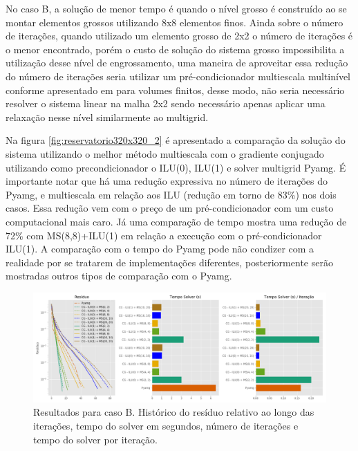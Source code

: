 No caso B, a solução de menor tempo é quando o nível grosso é construído ao se montar elementos grossos utilizando 8x8 elementos finos. Ainda sobre o número de iterações, quando utilizado um elemento grosso de 2x2 o número de iterações é o menor encontrado, porém o custo de solução do sistema grosso impossibilita a utilização desse nível de engrossamento, uma maneira de aproveitar essa redução do número de iterações seria utilizar um pré-condicionador multiescala multinível conforme apresentado em \cite{multilevel} para volumes finitos, desse modo, não seria necessário resolver o sistema linear na malha 2x2 sendo necessário apenas aplicar uma relaxação nesse nível similarmente ao multigrid.

Na figura \ref{fig:reservatorio320x320_2} é apresentado a comparação da solução do sistema utilizando o melhor método multiescala com o gradiente conjugado utilizando como precondicionador o ILU(0), ILU(1) e solver multigrid Pyamg. É importante notar que há uma redução expressiva no número de iterações do Pyamg, e multiescala em relação aos ILU (redução em torno de 83\%) nos dois casos. Essa redução vem com o preço de um pré-condicionador com um custo computacional mais caro. Já uma comparação de tempo mostra uma redução de 72\% com MS(8,8)+ILU(1) em relação a execução com o pré-condicionador ILU(1). A comparação com o tempo do Pyamg pode não condizer com a realidade por se tratarem de implementações diferentes, posteriormente serão mostradas outros tipos de comparação com o Pyamg.

\begin{figure}[!htbp]
\centering
\includegraphics[width=\textwidth]{chap08/figs/reservatorio320x320_1.png}
\caption{Resultados para caso B. Histórico do resíduo relativo ao longo das iterações, tempo do solver em segundos, número de iterações e tempo do solver por iteração. }
\label{fig:reservatorio320x320_1} 
\end{figure}


